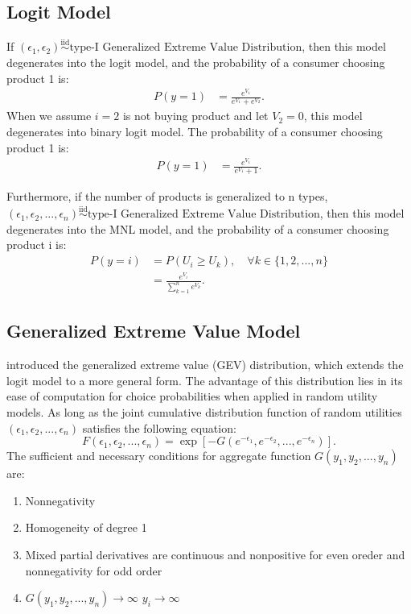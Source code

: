 \documentclass[12pt]{article}
\theoremstyle{definition}
\begin{document}
\begin{sloppypar}
\subsection{Logit Model}
If $(\epsilon_{1}, \epsilon_{2}) \overset{\mathrm{iid}}{\sim} \text{type-I Generalized Extreme Value Distribution}$, then this model degenerates into the logit model, and the probability of a consumer choosing product 1 is:
\begin{align*}
    P(y=1) &= \frac{e^{V_{1}}}{e^{V_{1}} + e^{V_{2}}}.
\end{align*}
When we assume $i=2$ is not buying product and let $V_{2}=0$, this model degenerates into binary logit model. The probability of a consumer choosing product 1 is:
\begin{align*}
    P(y=1) &= \frac{e^{V_{1}}}{e^{V_{1}} + 1}.
\end{align*}

Furthermore, if the number of products is generalized to n types, $(\epsilon_{1}, \epsilon_{2}, ..., \epsilon_{n}) \overset{\mathrm{iid}}{\sim} \text{type-I Generalized Extreme Value Distribution}$, then this model degenerates into the MNL model, and the probability of a consumer choosing product i is:
\begin{align*}
    P(y = i) &= P(U_i \geq U_k), \quad \forall k \in \{1, 2, ...,n\}\\
    &= \frac{e^{V_{i}}}{\sum_{k=1}^{n} e^{V_{k}}}.
\end{align*}

\subsection{Generalized Extreme Value Model}
\textcite{mcfadden1977} introduced the generalized extreme value (GEV) distribution, which extends the logit model to a more general form. The advantage of this distribution lies in its ease of computation for choice probabilities when applied in random utility models. As long as the joint cumulative distribution function of random utilities $(\epsilon_{1}, \epsilon_{2}, ..., \epsilon_{n})$ satisfies the following equation:
\begin{equation}
    F(\epsilon_{1}, \epsilon_{2}, ..., \epsilon_{n}) = \exp[-G(e^{-\epsilon_{1}}, e^{-\epsilon_{2}}, ..., e^{-\epsilon_{n}})].
\end{equation}
The sufficient and necessary conditions for aggregate function $G(y_1, y_2, ..., y_n)$ are:
\begin{enumerate}
    \item Nonnegativity
    \item Homogeneity of degree 1
    \item Mixed partial derivatives are continuous and nonpositive for even oreder and nonnegativity for odd order
    \item  $G(y_1, y_2, ..., y_n) \rightarrow \infty$  $y_i \rightarrow \infty$
\end{enumerate}


\end{sloppypar}
\end{document}
